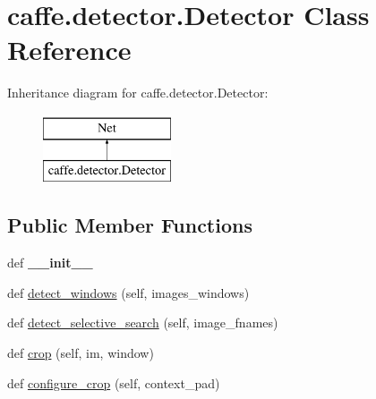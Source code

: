 \hypertarget{classcaffe_1_1detector_1_1_detector}{}\section{caffe.\+detector.\+Detector Class Reference}
\label{classcaffe_1_1detector_1_1_detector}
Inheritance diagram for caffe.\+detector.\+Detector\+:\begin{figure}[H]
\begin{center}
\leavevmode
\includegraphics[height=2.000000cm]{classcaffe_1_1detector_1_1_detector}
\end{center}
\end{figure}
\subsection*{Public Member Functions}
\begin{DoxyCompactItemize}
\item 
\hypertarget{classcaffe_1_1detector_1_1_detector_a9b149cf7637926192c2033d61f34617d}{}def {\bfseries \+\_\+\+\_\+init\+\_\+\+\_\+}\label{classcaffe_1_1detector_1_1_detector_a9b149cf7637926192c2033d61f34617d}

\item 
def \hyperlink{classcaffe_1_1detector_1_1_detector_a7ddd403050bacd8fcccc62705f2405ff}{detect\+\_\+windows} (self, images\+\_\+windows)
\item 
def \hyperlink{classcaffe_1_1detector_1_1_detector_a2d96c53701abd37152c5f078a18ebf08}{detect\+\_\+selective\+\_\+search} (self, image\+\_\+fnames)
\item 
def \hyperlink{classcaffe_1_1detector_1_1_detector_af71bb7e173a228c2e1577b9125310216}{crop} (self, im, window)
\item 
def \hyperlink{classcaffe_1_1detector_1_1_detector_a3706bb8bcd04387c065f7bb6b34f4875}{configure\+\_\+crop} (self, context\+\_\+pad)
\end{DoxyCompactItemize}

